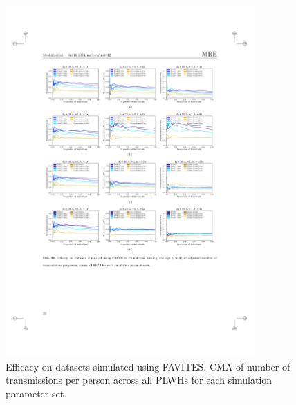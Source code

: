 \begin{figure} %
\centering
\includegraphics[width=0.85\textwidth]{figs/proact-efficacy-raw}
\caption[Raw ProACT Performance on Simulated Datasets]
{Efficacy on datasets simulated using FAVITES. \gls{CMA} of number of transmissions per person across all \glspl{PLWH} for each simulation parameter set.}
\label{fig:proact-efficacy-raw}
\end{figure}

